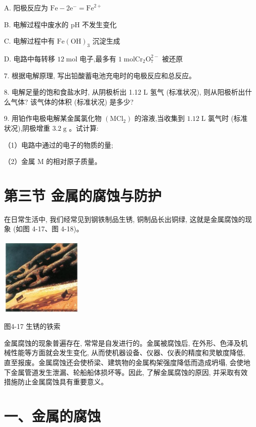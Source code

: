 \documentclass[10pt]{article}
\begin{document}
A. 阳极反应为 \(\mathrm{{Fe}} - 2{\mathrm{e}}^{ - } = {\mathrm{{Fe}}}^{2 + }\)

B. 电解过程中废水的 \(\mathrm{{pH}}\) 不发生变化

C. 电解过程中有 \(\mathrm{{Fe}}{\left( \mathrm{{OH}}\right) }_{3}\) 沉淀生成

D. 电路中每转移 \({12}\mathrm{\;{mol}}\) 电子,最多有 \(1\mathrm{\;{mol}}{\mathrm{{Cr}}}_{2}{\mathrm{O}}_{7}^{2 - }\) 被还原

7. 根据电解原理, 写出铅酸蓄电池充电时的电极反应和总反应。

8. 电解足量的饱和食盐水时, 从阴极析出 1.12 L 氢气 (标准状况), 则从阳极析出什么气体? 该气体的体积 (标准状况) 是多少?

9. 用铂作电极电解某金属氯化物 \(\left( {\mathrm{{MCl}}}_{2}\right)\) 的溶液,当收集到 \({1.12}\mathrm{\;L}\) 氯气时 (标准状况),阴极增重 \({3.2}\mathrm{\;g}\) 。试计算:

（1）电路中通过的电子的物质的量;

（2）金属 \(\mathrm{M}\) 的相对原子质量。

\section*{第三节 金属的腐蚀与防护}

在日常生活中, 我们经常见到钢铁制品生锈, 铜制品长出铜绿, 这就是金属腐蚀的现象 (如图 4-17、图 4-18)。

\begin{center}
\includegraphics[max width=0.3\textwidth]{images/0190da9d-8bfd-732f-bc2c-0b21d0f13b91_116_722467.jpg}
\end{center}

图4-17 生锈的铁索

金属腐蚀的现象普遍存在, 常常是自发进行的。金属被腐蚀后, 在外形、色泽及机械性能等方面就会发生变化, 从而使机器设备、仪器、仪表的精度和灵敏度降低, 直至报废。金属腐蚀还会使桥梁、建筑物的金属构架强度降低而造成坍塌, 会使地下金属管道发生泄漏、轮船船体损坏等。因此, 了解金属腐蚀的原因, 并采取有效措施防止金属腐蚀具有重要意义。

\section*{一、金属的腐蚀}
\end{document}
